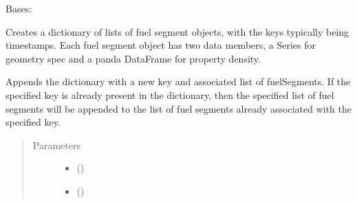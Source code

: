 \documentclass[letterpaper,10pt,openany,oneside,english]{sphinxmanual}
\begin{document}
\begin{fulllineitems}
\label{\detokenize{support_rst/fuelsegmentsgroups:fuelsegmentsgroups.FuelSegmentsGroups}}
Bases: 

Creates a dictionary of lists of fuel segment objects, with the keys
typically being timestamps. Each fuel segment object has two data members,
a  Series for geometry spec and a panda DataFrame for property
density.

\begin{fulllineitems}
\label{\detokenize{support_rst/fuelsegmentsgroups:fuelsegmentsgroups.FuelSegmentsGroups.AddGroup}}
Appends the dictionary with a new key and associated list of
fuelSegments. If the specified key is already present in the
dictionary, then the specified list of fuel segments will be appended
to the list of fuel segments already associated with the specified key.
\begin{quote}\begin{description}
\item[{Parameters}] \leavevmode\begin{itemize}
\item {} 
 () \textendash{} 

\item {} 
 () \textendash{} 

\end{itemize}

\end{description}\end{quote}

\end{fulllineitems}



\end{fulllineitems}
\end{document}
